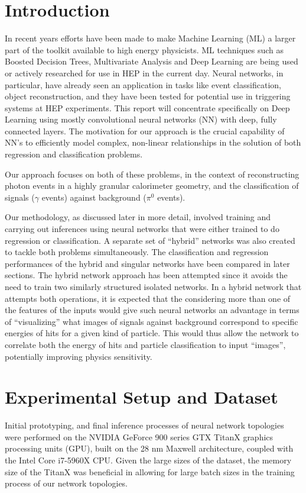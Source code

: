 \documentclass[twocolumn,aps,prd,reprint,superscriptaddress]{revtex4-1}
\newcommand{\q}[1]{``#1''}
\begin{document}
	\section{Introduction}
	In recent years efforts have been made to make Machine Learning (ML) a larger part of the toolkit available to high energy physicists. ML techniques such as Boosted Decision Trees, Multivariate Analysis and Deep Learning are being used or actively researched for use in HEP in the current day. Neural networks, in particular, have already seen an application in tasks like event classification, object reconstruction, and they have been tested for potential use in triggering systems at HEP experiments. This report will concentrate specifically on Deep Learning using mostly convolutional neural networks (NN) with deep, fully connected layers. The motivation for our approach is the crucial capability of NN's to efficiently model complex, non-linear relationships in the solution of both regression and classification problems.\par
	Our approach focuses on both of these problems, in the context of reconstructing photon events in a highly granular calorimeter geometry, and the classification of signals ($\gamma$ events) against background ($\pi^{0}$ events).\par 
	
	Our methodology, as discussed later in more detail, involved training and carrying out inferences using neural networks that were either trained to do regression or classification. A separate set of \q{hybrid} networks was also created to tackle both problems simultaneously. The classification and regression performances of the hybrid and singular networks have been compared in later sections. The hybrid network approach has been attempted since it avoids the need to train two similarly structured isolated networks. In a hybrid network that attempts both operations, it is expected that the considering more than one of the features of the inputs would give such neural networks an advantage in terms of \q{visualizing} what images of signals against background correspond to specific energies of hits for a given kind of particle. This would thus allow the network to correlate both the energy of hits and particle classification to input \q{images}, potentially improving physics sensitivity. \par
	
	
	
		 
	\section{Experimental Setup and Dataset}
	Initial prototyping, and final inference processes of neural network topologies were performed on the NVIDIA GeForce 900 series GTX TitanX graphics processing units (GPU), built on the 28 nm Maxwell architecture, coupled with the Intel Core i7-5960X CPU. Given the large sizes of the dataset, the memory size of the TitanX was beneficial in allowing for large batch sizes in the training process of our network topologies.
	
\end{document}
